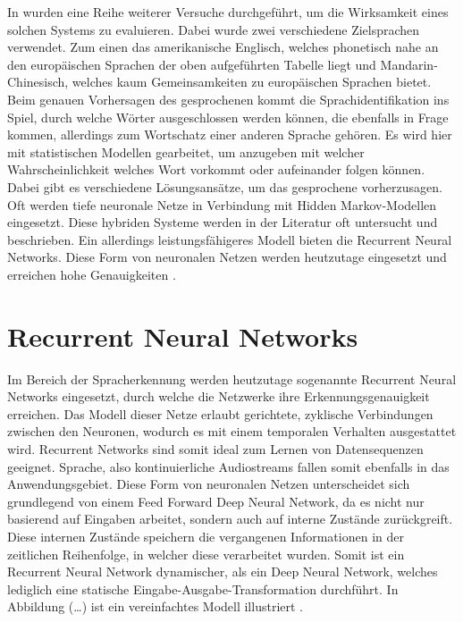 In {\cite{6639081}} wurden eine Reihe weiterer Versuche durchgeführt, um die Wirksamkeit eines solchen Systems zu evaluieren. Dabei wurde zwei verschiedene Zielsprachen verwendet. Zum einen das amerikanische Englisch, welches phonetisch nahe an den europäischen Sprachen der oben aufgeführten Tabelle liegt und Mandarin-Chinesisch, welches kaum Gemeinsamkeiten zu europäischen Sprachen bietet. Beim genauen Vorhersagen des gesprochenen kommt die Sprachidentifikation ins Spiel, durch welche Wörter ausgeschlossen werden können, die ebenfalls in Frage kommen, allerdings zum Wortschatz einer anderen Sprache gehören. Es wird hier mit statistischen Modellen gearbeitet, um anzugeben mit welcher Wahrscheinlichkeit welches Wort vorkommt oder aufeinander folgen können. Dabei gibt es verschiedene Lösungsansätze, um das gesprochene vorherzusagen. Oft werden tiefe neuronale Netze in Verbindung mit Hidden Markov-Modellen eingesetzt. Diese hybriden Systeme werden in der Literatur oft untersucht und beschrieben. Ein allerdings leistungsfähigeres Modell bieten die Recurrent Neural Networks. Diese Form von neuronalen Netzen werden heutzutage eingesetzt und erreichen hohe Genauigkeiten {\cite{Yu.2014}}.


\section{Recurrent Neural Networks}
Im Bereich der Spracherkennung werden heutzutage sogenannte Recurrent Neural Networks eingesetzt, durch welche die Netzwerke ihre Erkennungsgenauigkeit erreichen. Das Modell dieser Netze erlaubt gerichtete, zyklische Verbindungen zwischen den Neuronen, wodurch es mit einem temporalen Verhalten ausgestattet wird. Recurrent Networks sind somit ideal zum Lernen von Datensequenzen geeignet. Sprache, also kontinuierliche Audiostreams fallen somit ebenfalls in das Anwendungsgebiet. Diese Form von neuronalen Netzen unterscheidet sich grundlegend von einem Feed Forward Deep Neural Network, da es nicht nur basierend auf Eingaben arbeitet, sondern auch auf interne Zustände zurückgreift. Diese internen Zustände speichern die vergangenen Informationen in der zeitlichen Reihenfolge, in welcher diese verarbeitet wurden. Somit ist ein Recurrent Neural Network dynamischer, als ein Deep Neural Network, welches lediglich eine statische Eingabe-Ausgabe-Transformation durchführt. In Abbildung (…) ist ein vereinfachtes Modell illustriert {\cite{Yu.2014}}.

